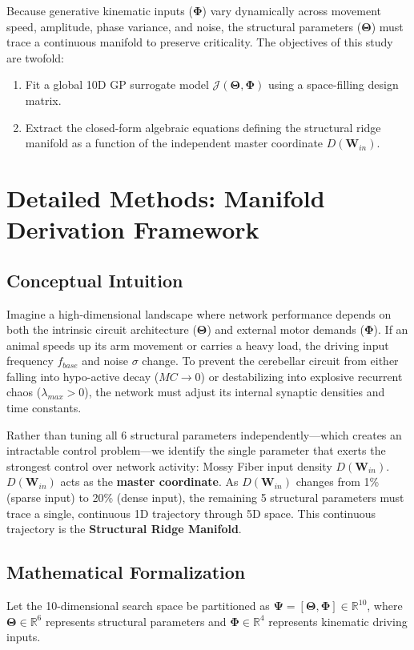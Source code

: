 \documentclass[11pt,a4paper]{article}
\begin{document}
Because generative kinematic inputs ($\boldsymbol{\Phi}$) vary dynamically across movement speed, amplitude, phase variance, and noise, the structural parameters ($\boldsymbol{\Theta}$) must trace a continuous manifold to preserve criticality. The objectives of this study are twofold:
\begin{enumerate}
    \item Fit a global 10D GP surrogate model $\mathcal{J}(\boldsymbol{\Theta}, \boldsymbol{\Phi})$ using a space-filling design matrix.
    \item Extract the closed-form algebraic equations defining the structural ridge manifold as a function of the independent master coordinate $D(\mathbf{W}_{in})$.
\end{enumerate}

\section{Detailed Methods: Manifold Derivation Framework}

\subsection{Conceptual Intuition}
Imagine a high-dimensional landscape where network performance depends on both the intrinsic circuit architecture ($\boldsymbol{\Theta}$) and external motor demands ($\boldsymbol{\Phi}$). If an animal speeds up its arm movement or carries a heavy load, the driving input frequency $f_{base}$ and noise $\sigma$ change. To prevent the cerebellar circuit from either falling into hypo-active decay ($MC \to 0$) or destabilizing into explosive recurrent chaos ($\lambda_{max} > 0$), the network must adjust its internal synaptic densities and time constants.

Rather than tuning all 6 structural parameters independently—which creates an intractable control problem—we identify the single parameter that exerts the strongest control over network activity: Mossy Fiber input density $D(\mathbf{W}_{in})$. $D(\mathbf{W}_{in})$ acts as the \textbf{master coordinate}. As $D(\mathbf{W}_{in})$ changes from 1\% (sparse input) to 20\% (dense input), the remaining 5 structural parameters must trace a single, continuous 1D trajectory through 5D space. This continuous trajectory is the \textbf{Structural Ridge Manifold}.

\subsection{Mathematical Formalization}
Let the 10-dimensional search space be partitioned as $\boldsymbol{\Psi} = [\boldsymbol{\Theta}, \boldsymbol{\Phi}] \in \mathbb{R}^{10}$, where $\boldsymbol{\Theta} \in \mathbb{R}^6$ represents structural parameters and $\boldsymbol{\Phi} \in \mathbb{R}^4$ represents kinematic driving inputs.
\end{document}

